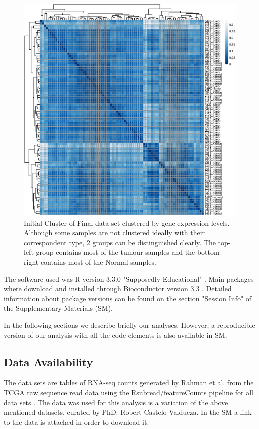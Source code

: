 \documentclass[9pt,twocolumn,twoside]{gsajnl}
\begin{document}
\begin{figure}[!h]
\centering

\includegraphics[width=.9\textwidth]{Clustering.eps}

\caption{Initial Cluster of Final data set clustered by gene expression levels. Although some samples are not clustered ideally with their correspondent type, 2 groups can be distinguished clearly. The top-left group contains most of the tumour samples and the bottom-right contains most of the Normal samples.
}
\label{fig:Clustering}
\end{figure}

The software used was R version 3.3.0 "Supposedly Educational" \cite{R}. Main packages where download and installed through Bioconductor version 3.3 \citep{bioconductor}. Detailed information about package versions can be found on the section "Session Info" of the Supplementary Materials (SM).

In the following sections we describe briefly our analyses. However, a reproducible version of our analysis with all the code elements is also available in SM.


\subsection*{Data Availability}

The data sets are tables of RNA-seq counts generated by Rahman et al. \cite{Rahman15112015} from the TCGA raw sequence read data using the Rsubread/featureCounts pipeline for all data sets \cite{Rsubread}. The data was used for this analysis is a variation of the above mentioned datasets, curated by PhD. Robert Castelo-Valdueza. In the SM a link to the data is attached in order to download it. 
\end{document}
